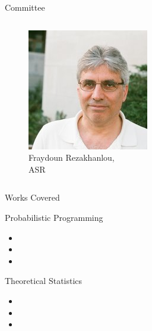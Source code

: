 \begin{frame}{Committee}
\begin{columns}[c]
\begin{column}{0.23\textwidth}
\begin{figure}
        \includegraphics[width=\textwidth,clip,trim={0cm 0 0cm 0}]{Figures/intro/fraydoun.jpg}
        \caption{\tiny Fraydoun Rezakhanlou,\\ ASR}
    \end{figure}
    \end{column}
    \end{columns}
\end{frame}

\begin{frame}{Works Covered}
    
    Probabilistic Programming
    
    {\tiny
    \begin{itemize}
        \item {}
        \item {}
        \item {}
    \end{itemize}
    }
    
    Theoretical Statistics
    
    {\tiny
    \begin{itemize}
        \item {}
        \item {}
        \item {}
    \end{itemize}
    }
\end{frame}